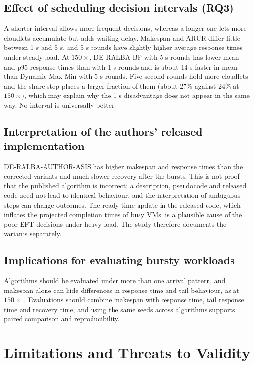 \documentclass[default,sn-mathphys,Numbered]{sn-jnl}
\begin{document}
\subsection{Effect of scheduling decision intervals (RQ3)}
A shorter interval allows more frequent decisions, whereas a longer one lets more cloudlets accumulate but adds waiting delay. Makespan and ARUR differ little between 1 s and 5 s, and 5 s rounds have slightly higher average response times under steady load. At $150\times$, DE-RALBA-BF with 5 s rounds has lower mean and p95 response times than with 1 s rounds and is about 14 s faster in mean than Dynamic Max-Min with 5 s rounds. Five-second rounds hold more cloudlets and the share step places a larger fraction of them (about 27\% against 24\% at $150\times$), which may explain why the 1 s disadvantage does not appear in the same way. No interval is universally better.

\subsection{Interpretation of the authors' released implementation}
DE-RALBA-AUTHOR-ASIS has higher makespan and response times than the corrected variants and much slower recovery after the bursts. This is not proof that the published algorithm is incorrect: a description, pseudocode and released code need not lead to identical behaviour, and the interpretation of ambiguous steps can change outcomes. The ready-time update in the released code, which inflates the projected completion times of busy VMs, is a plausible cause of the poor EFT decisions under heavy load. The study therefore documents the variants separately.

\subsection{Implications for evaluating bursty workloads}
Algorithms should be evaluated under more than one arrival pattern, and makespan alone can hide differences in response time and tail behaviour, as at $150\times$ \cite{dean2013tail}. Evaluations should combine makespan with response time, tail response time and recovery time, and using the same seeds across algorithms supports paired comparison and reproducibility.

\section{Limitations and Threats to Validity}\label{sec:limits}
\end{document}
